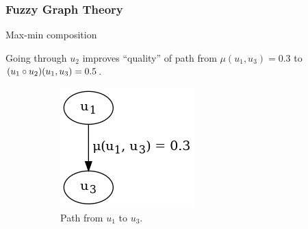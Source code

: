 \begin{frame}
	\frametitle{Fuzzy Graph Theory}

	\begin{block}{Max-min composition}

	Going through $u_2$ improves ``quality'' of path from $\mu(u_1, u_3) = 0.3$ to $(u_1 \circ u_2)(u_1, u_3) = 0.5$.

	\begin{figure}[htbp]
		\centering
		\begin{subfigure}[t]{0.22\textwidth}
			\centering
			\includegraphics[width=\linewidth,valign=t]{inc/fuzzy_graph_theory/maxmincomposition_before.png}
			\caption{Path from $u_1$ to $u_3$.}
		\end{subfigure}
		\quad
		\begin{subfigure}[t]{0.22\textwidth}
			\centering

\end{subfigure}
\end{figure}
\end{block}
\end{frame}
